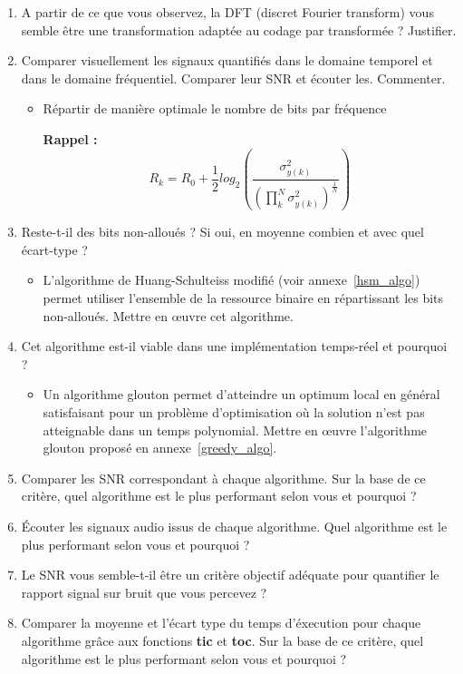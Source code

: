 \documentclass{article}
\begin{document}
\begin{enumerate}[label=\textbf{\arabic*})]
	\item A partir de ce que vous observez, la DFT (discret Fourier transform) vous semble être une transformation adaptée au codage par transformée ? Justifier.
	\item Comparer visuellement les signaux quantifiés dans le domaine temporel et dans le domaine fréquentiel. Comparer leur SNR et écouter les. Commenter.
	
	\begin{itemize}
		\item Répartir de manière optimale le nombre de bits par fréquence
		
		\textbf{Rappel :}
		$$
		R_k = R_0 + \frac{1}{2} log_2\left(\frac{\sigma_{y(k)}^2}{\left(\prod\limits_k^N \sigma_{y(k)}^2\right)^{\frac{1}{ N}}}\right)
		$$
	\end{itemize}

	\item Reste-t-il des bits non-alloués ? Si oui, en moyenne combien et avec quel écart-type ?
	
	\begin{itemize}
		\item L’algorithme de Huang-Schulteiss modifié (voir annexe~\ref{hsm_algo}) permet utiliser l’ensemble de la ressource binaire en répartissant les bits non-alloués. Mettre en \oe uvre cet algorithme.
	\end{itemize}
	\item Cet algorithme est-il viable dans une implémentation temps-réel et pourquoi ?
	\begin{itemize}
		\item Un algorithme glouton permet d'atteindre un optimum local en général satisfaisant pour un problème d'optimisation où la solution n'est pas atteignable dans un temps polynomial. Mettre en œuvre l’algorithme glouton proposé en annexe~\ref{greedy_algo}.
	\end{itemize}
	\item Comparer les SNR correspondant à chaque algorithme. Sur la base de ce critère, quel algorithme est le plus performant selon vous et pourquoi ?
	\item Écouter les signaux audio issus de chaque algorithme. Quel algorithme est le plus performant selon vous et pourquoi ?
	\item Le SNR vous semble-t-il être un critère objectif adéquate pour quantifier le rapport signal sur bruit que vous percevez ?
	\item Comparer la moyenne et l'écart type du temps d'éxecution pour chaque algorithme grâce aux fonctions \textbf{tic} et \textbf{toc}. Sur la base de ce critère, quel algorithme est le plus performant selon vous et pourquoi ?
	
\end{enumerate}
\end{document}
